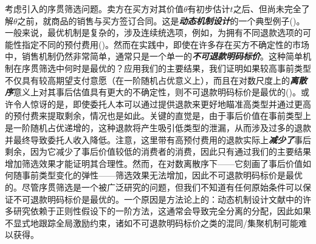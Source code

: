 \documentclass[12pt,letterpaper]{article}
\newenvironment{translation}{\color{blue}\noindent}{}
\theoremstyle{plain}
\theoremstyle{definition}
\theoremstyle{remark}
\renewcommand{\1}{\mathds{1}}
\theoremstyle{definition}
\begin{document}
\begin{translation}
考虑\citet{Courty2000}引入的序贯筛选问题。卖方在买方对其价值$\theta$有初步估计$t$之后、但尚未完全了解$\theta$之前，就商品的销售与买方签订合同。这是\textit{\textbf{动态机制设计}}的一个典型例子(\citealt*{Pavan2014})。一般来说，最优机制是复杂的，涉及连续统选项，例如，为拥有不同退款选项的可能性指定不同的预付费用(\citealt{Courty2000})。然而在实践中，即使在许多存在买方不确定性的市场中，销售机制仍然非常简单，通常只是一个单一的\textit{\textbf{不可退款明码标价}}。这种简单机制在序贯筛选中何时是最优的？应用我们的主要结果，我们证明如果较高事前类型不仅具有较高期望支付意愿（在一阶随机占优意义上），而且在对数尺度上的\textit{\textbf{离散序}}意义上对其事后估值具有更大的不确定性，则不可退款明码标价是最优的()。或许令人惊讶的是，即使委托人本可以通过提供退款来更好地瞄准高类型并通过更高的预付费来提取剩余，情况也是如此。关键的直觉是，由于事后价值在事前类型上是一阶随机占优递增的，这种退款将产生吸引低类型的泄漏，从而涉及过多的退款并最终导致委托人收入降低。注意，这里带有高预付费用的退款实际上\textit{\textbf{减少了}}事后剩余，因为它减少了事后价值较低的消费者的消费，因此只有通过我们的主要结果增加筛选效果才能证明其合理性。然而，在对数离散序下——它刻画了事后价值如何随事前类型变化的弹性——筛选效果无法增加，因此不可退款明码标价是最优的。尽管序贯筛选是一个被广泛研究的问题，但我们不知道有任何原始条件可以保证不可退款明码标价是最优的。一个原因是方法论上的：动态机制设计文献中的许多研究依赖于正则性假设下的一阶方法，这通常会导致完全分离的分配，因此如果不显式地跟踪全局激励约束，诸如不可退款明码标价之类的混同/集聚机制可能难以获得。
\end{translation}
\end{document}
